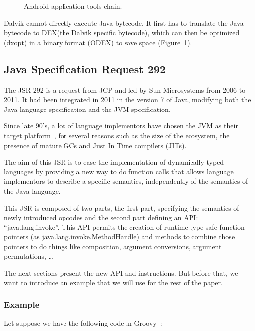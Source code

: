 \documentclass{sig-alternate}
\def \JCP{JCP\xspace}
\def \SUN{Sun Microsystems\xspace}
\def \DALVIK{Dalvik\xspace}
\def \Jsr{JSR\xspace}
\def \JSR{\Jsr 292\xspace}
\def \ANDROID{Android\xspace}
\def \JVM{JVM\xspace}
\def \DEX{DEX\xspace}
\begin{document}
      \begin{figure}[!ht]
        \centering \resizebox{\linewidth}{!}{}
        \caption{\ANDROID application tools-chain.}
        \label{DTC}
      \end{figure}

      \DALVIK cannot directly execute Java bytecode.
      It first has to translate the Java bytecode to \DEX (the \DALVIK specific bytecode),
      which can then be optimized (dxopt) in a binary format (\mbox{ODEX}) to save space (Figure~\ref{DTC}).

  \subsection{Java Specification Request 292}

    The \JSR is a request from \JCP and led by \SUN from 2006 to 2011.
    It had been integrated in 2011 in the version 7 of Java,
    modifying both the Java language specification and the \JVM specification.

    Since late 90's, a lot of language
    implementors have chosen the JVM as their target platform~\cite{wiki-jvm-lang},
    for several reasons such as the size of the ecosystem,
    the presence of mature GCs and Just In Time compilers (JITs).

    The aim of this \Jsr is to ease the implementation of dynamically typed languages
    by providing a new way to do function calls that allows language implementors
    to describe a specific semantics, independently of the semantics of the Java language.

    This \Jsr is composed of two parts, the first part, specifying the semantics of
    newly introduced opcodes and the second part defining an API: ``java.lang.invoke''.
    This API permits the creation of runtime type safe function pointers (as java.lang.invoke.MethodHandle)
    and methods to combine those pointers to do things like composition, argument conversions,
    argument permutations, \dots

    The next sections present the new API and instructions.
    But before that, we want to introduce an example that we will use for the rest of the paper.

    \subsubsection{Example}
      Let suppose we have the following code in Groovy~\cite{lang-groovy}:
\end{document}
